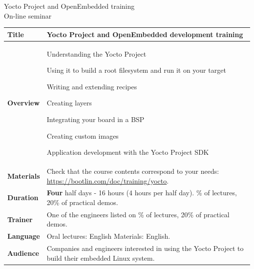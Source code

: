 \documentclass[a4paper,12pt,obeyspaces,spaces,hyphens]{article}
\begin{document}
\thispagestyle{fancy}

\setlength{\arrayrulewidth}{0.8pt}

\begin{center}
\LARGE
Yocto Project and OpenEmbedded training\\
\large
On-line seminar
\end{center}
\vspace{1cm}

\small
{}

 {
  \begin{tabularx}{\textwidth}{|g|h|}
    {\bf Title} & {\bf Yocto Project and OpenEmbedded development training} \\
    \hline

    {\bf Overview} &
    Understanding the Yocto Project \par
    Using it to build a root filesystem and run it on your target \par
    Writing and extending recipes \par
    Creating layers \par
    Integrating your board in a BSP \par
    Creating custom images \par
    Application development with the Yocto Project SDK \\
    \hline
    {\bf Materials} &
    Check that the course contents correspond to your needs:
    \newline \url{https://bootlin.com/doc/training/yocto}. \\
    \hline

    {\bf Duration} & {\bf Four} half days - 16 hours (4 hours per half day).
    \% of lectures, 20\% of practical demos. \\
    \hline

    {\bf Trainer} & One of the engineers listed on
    \% of lectures, 20\% of practical demos. \\
    \hline

    {\bf Language} & Oral lectures: English
    \newline Materials: English.\\
    \hline

    {\bf Audience} & Companies and engineers interested in using
    the Yocto Project to build their embedded Linux system.\\
    \hline


\end{tabularx}}
\end{document}
